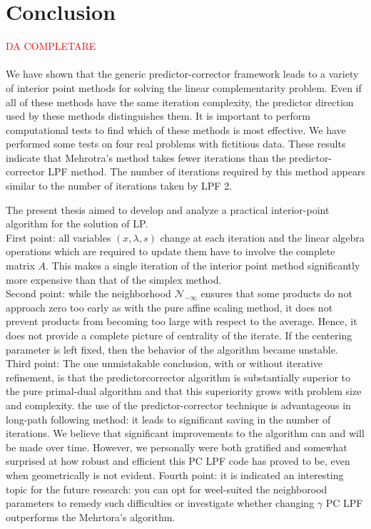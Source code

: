 \documentclass[a4paper,10 pt,titlepage,twoside]{book}
\theoremstyle{plain}
\theoremstyle{definition}
\theoremstyle{remark}
\begin{document}
\chapter{Conclusion}
\textcolor{red}{ DA COMPLETARE}\\
\\
We have shown that the generic predictor-corrector framework leads to a variety of interior point methods for solving the linear complementarity
problem. Even if all of these methods have the same iteration complexity, the
predictor direction used by these methods distinguishes them.
It is important to perform computational tests to find which of these methods
is most effective. We have performed some tests on four real
problems with fictitious data. These results indicate that Mehrotra's method takes
fewer iterations than the predictor-corrector LPF
method. The number of iterations required by this method appears similar to the
number of iterations taken by LPF 2.

The present thesis aimed to develop and analyze a practical interior-point algorithm for the solution of LP.\\
 First point: all variables $(x, \lambda, s)$ change at each iteration and the linear algebra operations which are required to update them have to involve the complete matrix $A$. This makes a single iteration of the interior point method significantly more expensive than that of the simplex method.\\
 Second point: while the neighborhood $\mathcal{N}_{-\infty}$ ensures that some products do not approach zero too early as with the pure affine scaling method, it does not prevent products from becoming too large with respect to the average. Hence, it does not provide a complete picture of centrality of the iterate.
If the centering parameter is left fixed, then the behavior of the
algorithm became unstable.\\
Third point: The one
unmistakable conclusion, with or without iterative refinement, is that the predictorcorrector algorithm is substantially superior to the pure primal-dual algorithm and
that this superiority grows with problem size and complexity.
 the use of the predictor-corrector technique is advantageous in long-path following method: it leads to significant saving in the number of iterations. We believe that significant improvements to the algorithm can and will be made over time.
However, we personally were both gratified and somewhat surprised at how robust and
efficient this PC LPF code has proved to be, even when geometrically is not evident. 
Fourth point: it is indicated an interesting
topic for the future research: you can opt for weel-suited the neighborood parameters to remedy such difficulties or investigate whether changing $\gamma$ PC LPF outperforms the Mehrtora's algorithm.
\appendix
\end{document}
